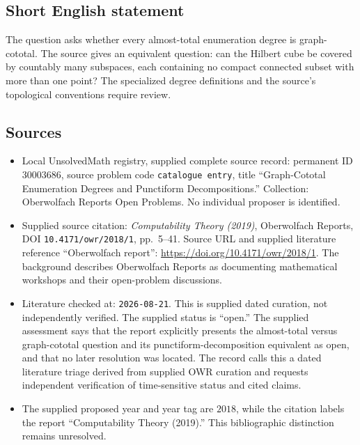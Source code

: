 \documentclass[11pt]{article}
\begin{document}
\subsection{Short English statement}
The question asks whether every almost-total enumeration degree is graph-cototal. The source gives an equivalent question: can the Hilbert cube be covered by countably many subspaces, each containing no compact connected subset with more than one point? The specialized degree definitions and the source's topological conventions require review.
\subsection{Sources}
\begin{itemize}
\item Local UnsolvedMath registry, supplied complete source record: permanent ID \(30003686\), source problem code \texttt{catalogue entry}, title ``Graph-Cototal Enumeration Degrees and Punctiform Decompositions.'' Collection: Oberwolfach Reports Open Problems. No individual proposer is identified.
\item Supplied source citation: \emph{Computability Theory (2019)}, Oberwolfach Reports, DOI \texttt{10.4171/owr/2018/1}, pp.\ 5--41. Source URL and supplied literature reference ``Oberwolfach report'': \url{https://doi.org/10.4171/owr/2018/1}. The background describes Oberwolfach Reports as documenting mathematical workshops and their open-problem discussions.
\item Literature checked at: \texttt{2026-08-21}. This is supplied dated curation, not independently verified. The supplied status is ``open.'' The supplied assessment says that the report explicitly presents the almost-total versus graph-cototal question and its punctiform-decomposition equivalent as open, and that no later resolution was located. The record calls this a dated literature triage derived from supplied OWR curation and requests independent verification of time-sensitive status and cited claims.
\item The supplied proposed year and year tag are \(2018\), while the citation labels the report ``Computability Theory (2019).'' This bibliographic distinction remains unresolved.
\end{itemize}
\end{document}
